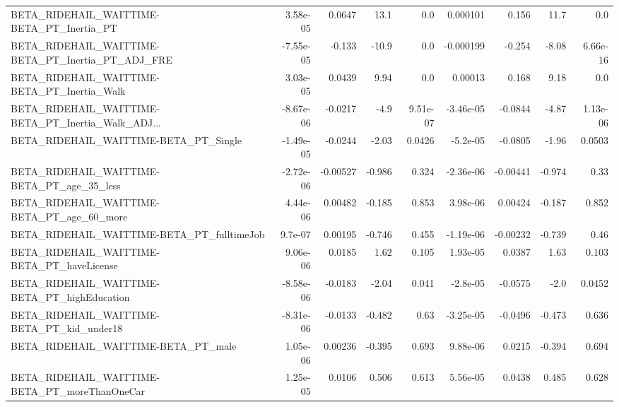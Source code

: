 \begin{tabular}{lrrrrrrrr}
BETA\_RIDEHAIL\_WAITTIME-BETA\_PT\_Inertia\_PT          &    3.58e-05 &       0.0647 &     13.1 &      0.0 &   0.000101 &       0.156 &         11.7 &           0.0 \\
BETA\_RIDEHAIL\_WAITTIME-BETA\_PT\_Inertia\_PT\_ADJ\_FRE  &   -7.55e-05 &       -0.133 &    -10.9 &      0.0 &  -0.000199 &      -0.254 &        -8.08 &      6.66e-16 \\
BETA\_RIDEHAIL\_WAITTIME-BETA\_PT\_Inertia\_Walk        &    3.03e-05 &       0.0439 &     9.94 &      0.0 &    0.00013 &       0.168 &         9.18 &           0.0 \\
BETA\_RIDEHAIL\_WAITTIME-BETA\_PT\_Inertia\_Walk\_ADJ... &   -8.67e-06 &      -0.0217 &     -4.9 & 9.51e-07 &  -3.46e-05 &     -0.0844 &        -4.87 &      1.13e-06 \\
BETA\_RIDEHAIL\_WAITTIME-BETA\_PT\_Single              &   -1.49e-05 &      -0.0244 &    -2.03 &   0.0426 &   -5.2e-05 &     -0.0805 &        -1.96 &        0.0503 \\
BETA\_RIDEHAIL\_WAITTIME-BETA\_PT\_age\_35\_less         &   -2.72e-06 &     -0.00527 &   -0.986 &    0.324 &  -2.36e-06 &    -0.00441 &       -0.974 &          0.33 \\
BETA\_RIDEHAIL\_WAITTIME-BETA\_PT\_age\_60\_more         &    4.44e-06 &      0.00482 &   -0.185 &    0.853 &   3.98e-06 &     0.00424 &       -0.187 &         0.852 \\
BETA\_RIDEHAIL\_WAITTIME-BETA\_PT\_fulltimeJob         &     9.7e-07 &      0.00195 &   -0.746 &    0.455 &  -1.19e-06 &    -0.00232 &       -0.739 &          0.46 \\
BETA\_RIDEHAIL\_WAITTIME-BETA\_PT\_haveLicense         &    9.06e-06 &       0.0185 &     1.62 &    0.105 &   1.93e-05 &      0.0387 &         1.63 &         0.103 \\
BETA\_RIDEHAIL\_WAITTIME-BETA\_PT\_highEducation       &   -8.58e-06 &      -0.0183 &    -2.04 &    0.041 &   -2.8e-05 &     -0.0575 &         -2.0 &        0.0452 \\
BETA\_RIDEHAIL\_WAITTIME-BETA\_PT\_kid\_under18         &   -8.31e-06 &      -0.0133 &   -0.482 &     0.63 &  -3.25e-05 &     -0.0496 &       -0.473 &         0.636 \\
BETA\_RIDEHAIL\_WAITTIME-BETA\_PT\_male                &    1.05e-06 &      0.00236 &   -0.395 &    0.693 &   9.88e-06 &      0.0215 &       -0.394 &         0.694 \\
BETA\_RIDEHAIL\_WAITTIME-BETA\_PT\_moreThanOneCar      &    1.25e-05 &       0.0106 &    0.506 &    0.613 &   5.56e-05 &      0.0438 &        0.485 &         0.628 \\

\end{tabular}

